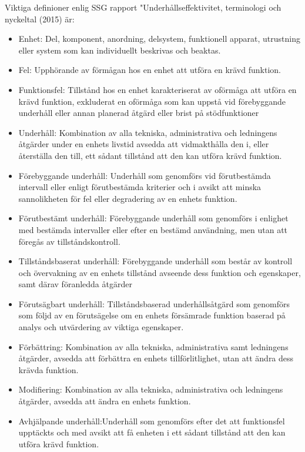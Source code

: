 	Viktiga definioner enlig SSG rapport "Underhållseffektivitet, terminologi och nyckeltal (2015) är:
\begin{itemize}	
  \item Enhet: Del, komponent, anordning, delsystem, funktionell apparat, utrustning eller system som kan individuellt beskrivas och beaktas. 
  \item Fel: Upphörande av förmågan hos en enhet att utföra en krävd funktion. 
  \item Funktionsfel: Tillstånd hos en enhet karakteriserat av oförmåga att utföra en krävd funktion, exkluderat en oförmåga som kan uppstå vid förebyggande underhåll eller annan planerad åtgärd eller brist på stödfunktioner
	\item Underhåll: Kombination av alla tekniska, administrativa och ledningens åtgärder under en enhets livstid avsedda att vidmakthålla den i, eller återställa den till, ett sådant tillstånd att den kan utföra krävd funktion.
  \item Förebyggande underhåll: Underhåll som genomförs vid förutbestämda intervall eller enligt förut\-bestämda kriterier och i avsikt att minska sannolikheten för fel eller degradering av en enhets funktion.
	\item Förutbestämt underhåll: Förebyggande underhåll som genomförs i enlighet med bestämda intervaller eller efter en bestämd användning, men utan att föregås av tillståndskontroll.
	\item Tillståndsbaserat underhåll: Förebyggande underhåll som består av kontroll och övervakning av en enhets tillstånd avseende dess funktion och egenskaper, samt därav föranledda åtgärder
	\item Förutsägbart underhåll: Tillståndsbaserad underhållsåtgärd som genomförs som följd av en förutsägelse om en enhets försämrade funktion baserad på analys och utvärdering av viktiga egenskaper.
	\item Förbättring: Kombination av alla tekniska, administrativa samt ledningens åtgärder, avsedda att förbättra en enhets tillförlitlighet, utan att ändra dess krävda funktion.
	\item Modifiering: Kombination av alla tekniska, administrativa och ledningens åtgärder, avsedda att ändra en enhets funktion.
	\item Avhjälpande underhåll:Underhåll som genomförs efter det att funktionsfel upptäckts och med avsikt att få enheten i ett sådant tillstånd att den kan utföra krävd funktion.

\end{itemize}
